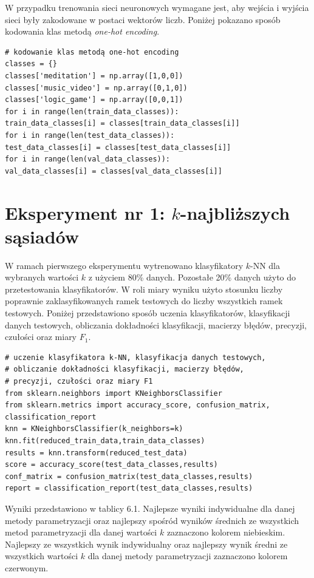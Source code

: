 \documentclass[notitlepage]{report}
\begin{document}
W przypadku trenowania sieci neuronowych wymagane jest, aby wejścia i wyjścia sieci były zakodowane w postaci wektorów liczb. Poniżej pokazano sposób kodowania klas metodą \textit{one-hot encoding}.

\begin{lstlisting}
# kodowanie klas metodą one-hot encoding
classes = {}
classes['meditation'] = np.array([1,0,0])
classes['music_video'] = np.array([0,1,0])
classes['logic_game'] = np.array([0,0,1])
for i in range(len(train_data_classes)):
train_data_classes[i] = classes[train_data_classes[i]]
for i in range(len(test_data_classes)):
test_data_classes[i] = classes[test_data_classes[i]]
for i in range(len(val_data_classes)):
val_data_classes[i] = classes[val_data_classes[i]]
\end{lstlisting}

\section{Eksperyment nr 1: $k$-najbliższych sąsiadów}
W ramach pierwszego eksperymentu wytrenowano klasyfikatory $k$-NN dla wybranych wartości $k$ z użyciem 80\% danych. Pozostałe 20\% danych użyto do przetestowania klasyfikatorów. W roli miary wyniku użyto stosunku liczby poprawnie zaklasyfikowanych ramek testowych do liczby wszystkich ramek testowych. Poniżej przedstawiono sposób uczenia klasyfikatorów, klasyfikacji danych testowych, obliczania dokładności klasyfikacji, macierzy błędów, precyzji, czułości oraz miary $F_1$.

\begin{lstlisting}
# uczenie klasyfikatora k-NN, klasyfikacja danych testowych,
# obliczanie dokładności klasyfikacji, macierzy błędów,
# precyzji, czułości oraz miary F1
from sklearn.neighbors import KNeighborsClassifier
from sklearn.metrics import accuracy_score, confusion_matrix, classification_report
knn = KNeighborsClassifier(k_neighbors=k)
knn.fit(reduced_train_data,train_data_classes)
results = knn.transform(reduced_test_data)
score = accuracy_score(test_data_classes,results)
conf_matrix = confusion_matrix(test_data_classes,results)
report = classification_report(test_data_classes,results)
\end{lstlisting}

Wyniki przedstawiono w tablicy 6.1. Najlepsze wyniki indywidualne dla danej metody parametryzacji oraz najlepszy spośród wyników średnich ze wszystkich metod parametryzacji dla danej wartości $k$ zaznaczono kolorem niebieskim. Najlepszy ze wszystkich wynik indywidualny oraz najlepszy wynik średni ze wszystkich wartości $k$ dla danej metody parametryzacji zaznaczono kolorem czerwonym.
\end{document}
